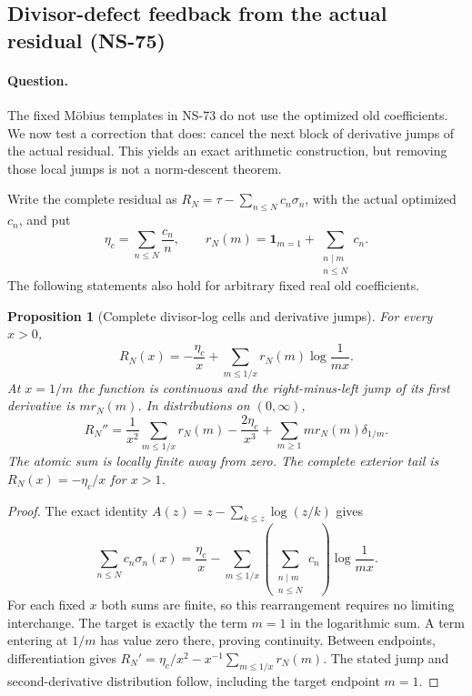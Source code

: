 \documentclass[11pt]{article}
\newtheorem{proposition}[theorem]{Proposition}
\theoremstyle{remark}
\begin{document}
\subsection{Divisor-defect feedback from the actual residual (NS-75)}
\label{sec:ns75-divisor-feedback}

\paragraph{Question.}
The fixed M\"obius templates in NS-73 do not use the optimized old
coefficients. We now test a correction that does: cancel the next block
of derivative jumps of the actual residual. This yields an exact
arithmetic construction, but removing those local jumps is not a
norm-descent theorem.

Write the complete residual as
$R_N=\tau-\sum_{n\leq N}c_n\sigma_n$, with the actual optimized $c_n$,
and put
\[
 \eta_c=\sum_{n\leq N}\frac{c_n}{n},\qquad
 r_N(m)=\mathbf1_{m=1}+\sum_{\substack{n\mid m\\n\leq N}}c_n.
\]
The following statements also hold for arbitrary fixed real old coefficients.

\begin{proposition}[Complete divisor-log cells and derivative jumps]
\label{prop:ns75-divisor-cells}
For every $x>0$,
\begin{equation}
 R_N(x)=-\frac{\eta_c}{x}
       +\sum_{m\leq1/x}r_N(m)\log\frac1{mx}.
 \label{eq:ns75-divisor-cells}
\end{equation}
At $x=1/m$ the function is continuous and the right-minus-left jump of
its first derivative is $m r_N(m)$. In distributions on $(0,\infty)$,
\begin{equation}
 R_N''=\frac1{x^2}\sum_{m\leq1/x}r_N(m)
           -\frac{2\eta_c}{x^3}
           +\sum_{m\geq1}m r_N(m)\delta_{1/m}.
 \label{eq:ns75-jump-measure}
\end{equation}
The atomic sum is locally finite away from zero. The complete exterior
tail is $R_N(x)=-\eta_c/x$ for $x>1$.
\end{proposition}
\begin{proof}
The exact identity
$A(z)=z-\sum_{k\leq z}\log(z/k)$ gives
\[
 \sum_{n\leq N}c_n\sigma_n(x)
 =\frac{\eta_c}{x}-\sum_{m\leq1/x}
       \left(\sum_{\substack{n\mid m\\n\leq N}}c_n\right)
       \log\frac1{mx}.
\]
For each fixed $x$ both sums are finite, so this rearrangement requires
no limiting interchange. The target is exactly the term $m=1$ in the
logarithmic sum. A term entering at $1/m$ has value zero there, proving
continuity. Between endpoints, differentiation gives
$R_N'=\eta_c/x^2-x^{-1}\sum_{m\leq1/x}r_N(m)$.
The stated jump and second-derivative distribution follow, including
the target endpoint $m=1$.
\end{proof}
\end{document}
